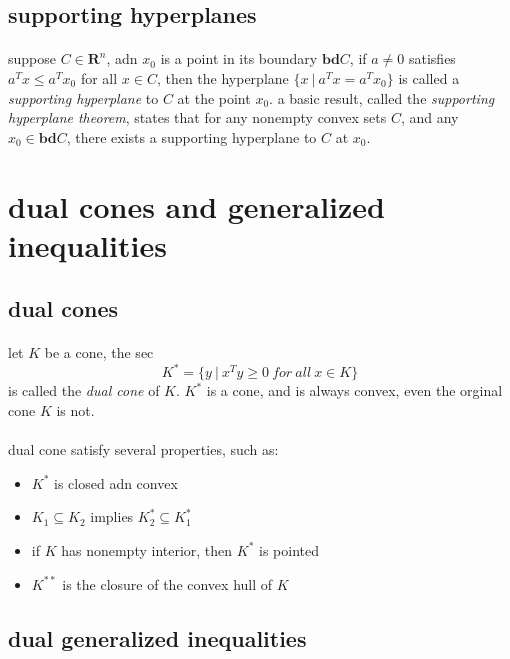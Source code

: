 \documentclass{article}
\begin{document}
  \subsection{supporting hyperplanes}
    \paragraph{} suppose $C \in \mathbf{R}^n$, adn $x_0$ is a point in its boundary $\mathbf{bd}C$, if $a \neq 0$ satisfies $a^Tx \leq a^Tx_0$ for all $x \in C$, then the hyperplane $\{x\ |\ a^Tx = a^Tx_0\}$ is called a \textit{supporting hyperplane} to $C$ at the point $x_0$. a basic result, called the \textit{supporting hyperplane theorem}, states that for any nonempty convex sets $C$, and any $x_0 \in \mathbf{bd} C $, there exists a supporting hyperplane to $C$ at $x_0$.
\section{dual cones and generalized inequalities}
  \subsection{dual cones}
    \paragraph{} let $K$ be a cone, the sec
    \begin{equation}
      K^* = \{y\ |\ x^Ty \geq 0\ for\ all\ x \in K\}
    \end{equation}
    is called the \textit{dual cone} of $K$. $K^*$ is a cone, and is always convex, even the orginal cone $K$ is not.
    \paragraph{} dual cone satisfy several properties, such as:
    \begin{itemize}
      \item $K^*$ is closed adn convex
      \item $K_1 \subseteq K_2$ implies $K_2^* \subseteq K_1^*$
      \item if $K$ has nonempty interior, then $K^*$ is pointed
      \item $K^{**}$ is the closure of the convex hull of $K$
    \end{itemize}
  \subsection{dual generalized inequalities}
\end{document}

